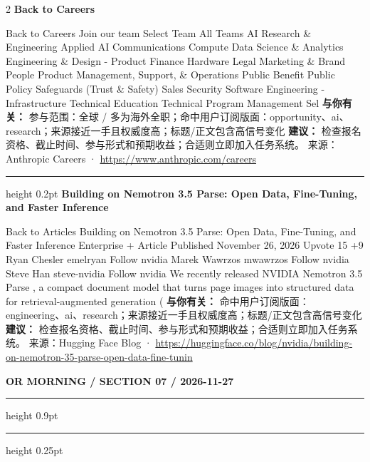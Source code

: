 \documentclass[10.5pt]{ctexart}
\begin{document}
\begin{multicols}{2}
{\large\bfseries Back to Careers}\par
Back to Careers Join our team Select Team All Teams AI Research \& Engineering Applied AI Communications Compute Data Science \& Analytics Engineering \& Design - Product Finance Hardware Legal Marketing \& Brand People Product Management, Support, \& Operations Public Benefit Public Policy Safeguards (Trust \& Safety) Sales Security Software Engineering - Infrastructure Technical Education Technical Program Management Sel
\textbf{与你有关：} 参与范围：全球 / 多为海外全职；命中用户订阅版面：opportunity、ai、research；来源接近一手且权威度高；标题/正文包含高信号变化
\textbf{建议：} 检查报名资格、截止时间、参与形式和预期收益；合适则立即加入任务系统。
{\footnotesize\color{ormuted} 来源：Anthropic Careers · \url{https://www.anthropic.com/careers}}
\vspace{2mm}
\hrule height 0.2pt
\vspace{2mm}
{\large\bfseries Building on Nemotron 3.5 Parse: Open Data, Fine-Tuning, and Faster Inference}\par
Back to Articles Building on Nemotron 3.5 Parse: Open Data, Fine-Tuning, and Faster Inference Enterprise + Article Published November 26, 2026 Upvote 15 +9 Ryan Chesler emelryan Follow nvidia Marek Wawrzos mwawrzos Follow nvidia Steve Han steve-nvidia Follow nvidia We recently released NVIDIA Nemotron 3.5 Parse , a compact document model that turns page images into structured data for retrieval-augmented generation (
\textbf{与你有关：} 命中用户订阅版面：engineering、ai、research；来源接近一手且权威度高；标题/正文包含高信号变化
\textbf{建议：} 检查报名资格、截止时间、参与形式和预期收益；合适则立即加入任务系统。
{\footnotesize\color{ormuted} 来源：Hugging Face Blog · \url{https://huggingface.co/blog/nvidia/building-on-nemotron-35-parse-open-data-fine-tunin}}
\end{multicols}
\newpage
{\small\bfseries OR MORNING / SECTION 07 / 2026-11-27}
\vspace{2mm}
\hrule height 0.9pt
\vspace{1.5mm}
\hrule height 0.25pt
\vspace{4mm}
\end{document}
